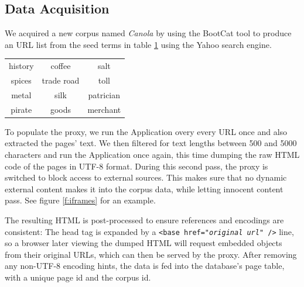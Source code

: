 \subsection{Data Acquisition\label{datagather}}

We acquired a new corpus named \textit{Canola} by using the BootCat tool to produce an URL list from the seed terms in table \ref{t:seed} using the Yahoo search engine. 

\begin{table}
\label{t:seed}
\centering
{}
\begin{tabular}[h]{ccc}
        history
&        coffee 
&        salt \\
        spices 
&        trade road
&        toll \\
        metal
&        silk 
&        patrician \\
        pirate 
&        goods
&        merchant 
\end{tabular}
\end{table}


To populate the proxy, we run the Application overy every URL once and also extracted the pages' text.
We then filtered for text lengths between 500 and 5000 characters and run the Application once again, this time dumping the raw HTML code of the pages in UTF-8 format.
During this second pass, the proxy is switched to block access to external sources.
This makes sure that no dynamic external content makes it into the corpus data, while letting innocent content pass.
See figure \ref{f:iframes} for an example.


The resulting HTML is post-processed to ensure references and encodings are consistent:
The head tag is expanded by a \texttt{<base href="\textit{original url}" />} line, so a browser later viewing the dumped HTML will request embedded objects from their original URLs, which can then be served by the proxy.
After removing any non-UTF-8 encoding hints, the data is fed into the database's page table, with a unique page id and the corpus id.

